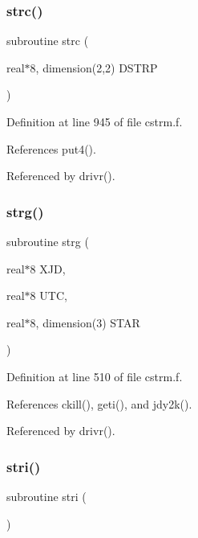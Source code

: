 \subsubsection{\texorpdfstring{strc()}{strc()}}
{\footnotesize\ttfamily subroutine strc (\begin{DoxyParamCaption}\item[{real$\ast$8, dimension(2,2)}]{D\+S\+T\+RP }\end{DoxyParamCaption})}



Definition at line 945 of file cstrm.\+f.



References put4().



Referenced by drivr().

\mbox{\label{cstrm_8f_ac7544830764ddfede7a3de635483a4e5}} 
\subsubsection{\texorpdfstring{strg()}{strg()}}
{\footnotesize\ttfamily subroutine strg (\begin{DoxyParamCaption}\item[{real$\ast$8}]{X\+JD,  }\item[{real$\ast$8}]{U\+TC,  }\item[{real$\ast$8, dimension(3)}]{S\+T\+AR }\end{DoxyParamCaption})}



Definition at line 510 of file cstrm.\+f.



References ckill(), geti(), and jdy2k().



Referenced by drivr().

\mbox{\label{cstrm_8f_a6cebfa9d7b09bbf12e73113d94dae7ed}} 
\subsubsection{\texorpdfstring{stri()}{stri()}}
{\footnotesize\ttfamily subroutine stri (\begin{DoxyParamCaption}{ }\end{DoxyParamCaption})}



